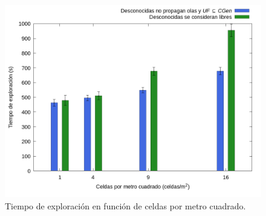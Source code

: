 






\begin{figure}[H]
  \centerfloat

  \includegraphics[clip=true, width=\graphlen]{imagenes/graficas_chicas/graficas_histo_num/desconocido/exploration_time.png}

  \caption{Tiempo de exploración en función de celdas por metro cuadrado.}\label{fig:gra:des:et}

\end{figure}

